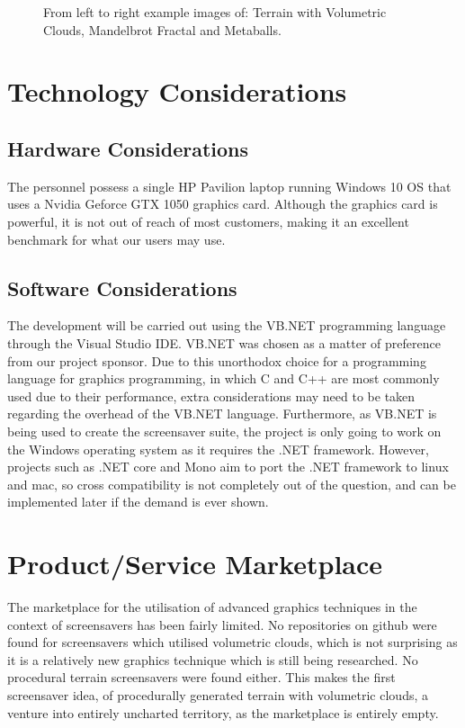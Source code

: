 \documentclass[10pt, openany]{book}
\begin{document}
\begin{figure}[H]
\begin{minipage}{.3\textwidth}
\end{minipage}
\caption{From left to right example images of: Terrain with Volumetric Clouds, Mandelbrot Fractal and Metaballs.}
\end{figure}	

\section{Technology Considerations}

\subsection{Hardware Considerations}

The personnel possess a single HP Pavilion laptop running Windows 10 OS that uses a Nvidia Geforce GTX 1050 graphics card. Although the graphics card is powerful, it is not out of reach of most customers, making it an excellent benchmark for what our users may use.

\subsection{Software Considerations}

The development will be carried out using the VB.NET programming language through the Visual Studio IDE. VB.NET was chosen as a matter of preference from our project sponsor. Due to this unorthodox choice for a programming language for graphics programming, in which C and C++ are most commonly used due to their performance, extra considerations may need to be taken regarding the overhead of the VB.NET language. Furthermore, as VB.NET is being used to create the screensaver suite, the project is only going to work on the Windows operating system as it requires the .NET framework. However, projects such as .NET core and Mono aim to port the .NET framework to linux and mac, so cross compatibility is not completely out of the question, and can be implemented later if the demand is ever shown. 

\section{Product/Service Marketplace}

The marketplace for the utilisation of advanced graphics techniques in the context of screensavers has been fairly limited. No repositories on github were found for screensavers which utilised volumetric clouds, which is not surprising as it is a relatively new graphics technique which is still being researched. No procedural terrain screensavers were found either. This makes the first screensaver idea, of procedurally generated terrain with volumetric clouds, a venture into entirely uncharted territory, as the marketplace is entirely empty.
\end{document}
